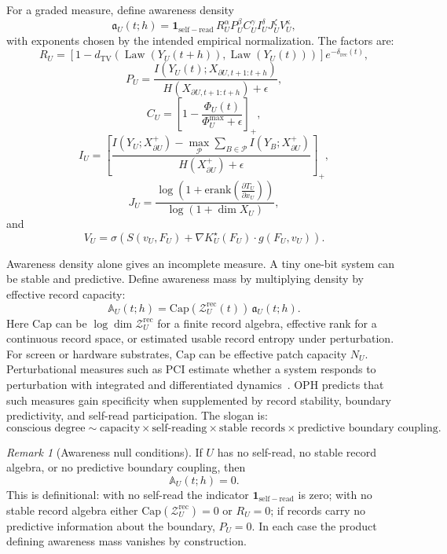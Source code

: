 \documentclass[11pt]{article}
\theoremstyle{remark}
\newtheorem{remark}[theorem]{Remark}
\theoremstyle{plain}
\newcommand{\TV}{\mathrm{TV}}
\newcommand{\rec}{\mathrm{rec}}
\newcommand{\bd}{\partial}
\newcommand{\erank}{\mathrm{erank}}
\begin{document}
For a graded measure, define awareness density
\[
\mathfrak a_U(t;h)
=
\mathbf 1_{\mathrm{self-read}}\,
R_U^\alpha
P_U^\beta
C_U^\gamma
I_U^\delta
J_U^\zeta
V_U^\kappa,
\]
with exponents chosen by the intended empirical normalization. The factors are:
\[
R_U
=
\left[
1-
d_{\TV}\!\left(
\operatorname{Law}(Y_U(t+h)),
\operatorname{Law}(Y_U(t))
\right)
\right]
e^{-\delta_{\rec}(t)},
\]
\[
P_U
=
\frac{
I\!\left(Y_U(t);X_{\bd U,t+1:t+h}\right)
}{
H\!\left(X_{\bd U,t+1:t+h}\right)+\epsilon
},
\]
\[
C_U
=
\left[
1-\frac{\Phi_U(t)}{\Phi_U^{\max}+\epsilon}
\right]_+,
\]
\[
I_U
=
\left[
\frac{
I(Y_U;X_{\bd U}^{+})
-
\max_{\mathcal P}
\sum_{B\in\mathcal P}I(Y_B;X_{\bd U}^{+})
}{
H(X_{\bd U}^{+})+\epsilon
}
\right]_+,
\]
\[
J_U
=
\frac{
\log\!\left(1+\erank\!\left(\frac{\partial T_U}{\partial x_U}\right)\right)
}{
\log(1+\dim X_U)
},
\]
and
\[
V_U
=
\sigma\!\left(
S(v_U,F_U)+\nabla K_U^\star(F_U)\cdot g(F_U,v_U)
\right).
\]

Awareness density alone gives an incomplete measure. A tiny one-bit system can be stable and predictive. Define awareness mass by multiplying density by effective record capacity:
\[
\boxed{
\mathbb A_U(t;h)
=
\mathrm{Cap}\!\left(\mathcal Z_U^{\rec}(t)\right)\,
\mathfrak a_U(t;h).
}
\]
Here \(\mathrm{Cap}\) can be \(\log\dim \mathcal Z_U^{\rec}\) for a finite record algebra, effective rank for a continuous record space, or estimated usable record entropy under perturbation. For screen or hardware substrates, \(\mathrm{Cap}\) can be effective patch capacity \(N_U\). Perturbational measures such as PCI estimate whether a system responds to perturbation with integrated and differentiated dynamics~\cite{Casali2013PCI}. OPH predicts that such measures gain specificity when supplemented by record stability, boundary predictivity, and self-read participation. The slogan is:
\[
\boxed{
\text{conscious degree}
\sim
\text{capacity}
\times
\text{self-reading}
\times
\text{stable records}
\times
\text{predictive boundary coupling}.
}
\]

\begin{remark}[Awareness null conditions]
If \(U\) has no self-read, no stable record algebra, or no predictive boundary coupling, then
\[
\mathbb A_U(t;h)=0.
\]
This is definitional: with no self-read the indicator \(\mathbf 1_{\mathrm{self-read}}\) is zero; with no stable record algebra either \(\mathrm{Cap}(\mathcal Z_U^{\rec})=0\) or \(R_U=0\); if records carry no predictive information about the boundary, \(P_U=0\). In each case the product defining awareness mass vanishes by construction.
\end{remark}
\end{document}
